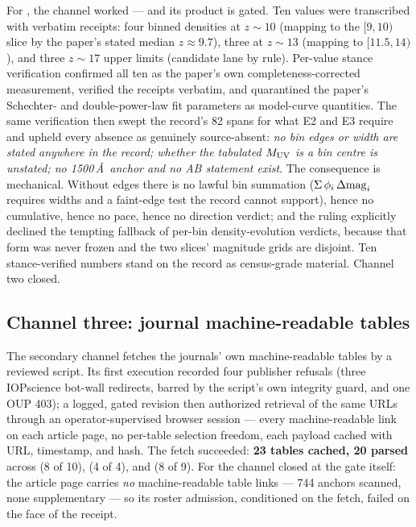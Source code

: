 \documentclass[twocolumn]{aastex702}
\begin{document}
For \citet{weibel26}, the channel worked --- and its product is gated. Ten values were
transcribed with verbatim receipts: four binned densities at $z\sim10$ (mapping to the
$[9,10)$ slice by the paper's stated median $z\approx9.7$), three at $z\sim13$ (mapping
to $[11.5,14)$), and three $z\sim17$ upper limits (candidate lane by rule). Per-value
stance verification confirmed all ten as the paper's own completeness-corrected
measurement, verified the receipts verbatim, and quarantined the paper's Schechter- and
double-power-law fit parameters as model-curve quantities. The same verification then
swept the record's 82 spans for what E2 and E3 require and upheld every absence as
genuinely source-absent: \emph{no bin edges or width are stated anywhere in the record;
whether the tabulated $M_{\rm UV}$ is a bin centre is unstated; no 1500\,\AA\ anchor and
no AB statement exist}. The consequence is mechanical. Without edges there is no lawful
bin summation ($\Sigma\,\phi_i\,\Delta{\rm mag}_i$ requires widths and a faint-edge test
the record cannot support), hence no cumulative, hence no pace, hence no direction
verdict; and the ruling explicitly declined the tempting fallback of per-bin
density-evolution verdicts, because that form was never frozen and the two slices'
magnitude grids are disjoint. Ten stance-verified numbers stand on the record as
census-grade material. Channel two closed.

\subsection{Channel three: journal machine-readable tables} \label{sec:chan3}

The secondary channel fetches the journals' own machine-readable tables by a reviewed
script. Its first execution recorded four publisher refusals (three IOPscience bot-wall
redirects, barred by the script's own integrity guard, and one OUP 403); a logged,
gated revision then authorized retrieval of the same URLs through an operator-supervised
browser session --- every machine-readable link on each article page, no per-table
selection freedom, each payload cached with URL, timestamp, and hash. The fetch
succeeded: \textbf{23 tables cached, 20 parsed} across \citet{harikane23} (8 of 10),
\citet{harikane24} (4 of 4), and \citet{finkelstein24} (8 of 9). For \citet{donnan23}
the channel closed at the gate itself: the article page carries \emph{no}
machine-readable table links --- 744 anchors scanned, none supplementary --- so its
roster admission, conditioned on the fetch, failed on the face of the receipt.
\end{document}
